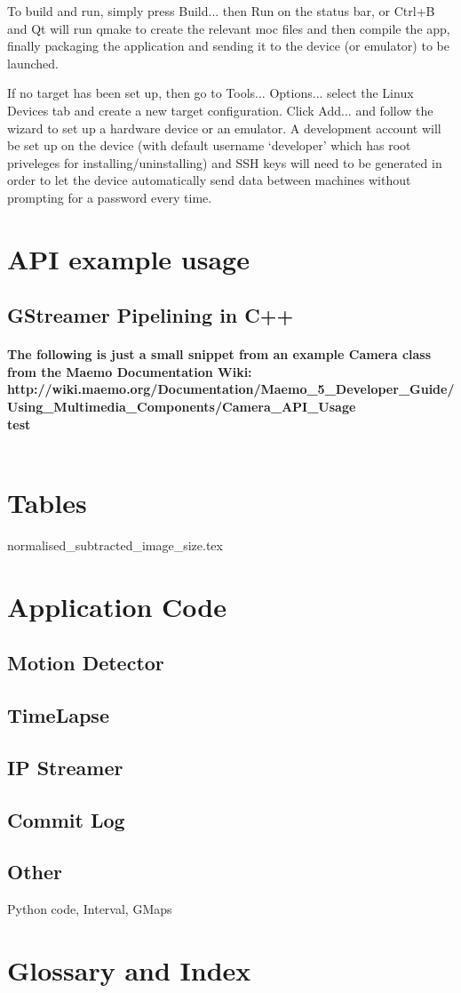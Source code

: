 To build and run, simply press Build... then Run on the status bar, or Ctrl+B and Qt will run qmake to create the relevant moc files and then compile the app, finally packaging the application and sending it to the device (or emulator) to be launched.

If no target has been set up, then go to Tools... Options... select the Linux Devices tab and create a new target configuration. Click Add... and follow the wizard to set up a hardware device or an emulator. A development account will be set up on the device (with default username ‘developer’ which has root priveleges for installing/uninstalling) and SSH keys will need to be generated in order to let the device automatically send data between machines without prompting for a password every time.

\section{API example usage}
\subsection{GStreamer Pipelining in C++}
\paragraph{ The following is just a small snippet from an example Camera class from the Maemo Documentation Wiki:\\http://wiki.maemo.org/Documentation/Maemo\_5\_Developer\_Guide/Using\_Multimedia\_Components/Camera\_API\_Usage
\\ test\\\\}


\section{Tables}
{normalised_subtracted_image_size.tex}


\section{Application Code}
\subsection{Motion Detector}
\subsection{TimeLapse}
\subsection{IP Streamer}
\subsection{Commit Log}
\subsection{Other}{Python code, Interval, GMaps}

\section{Glossary and Index}
